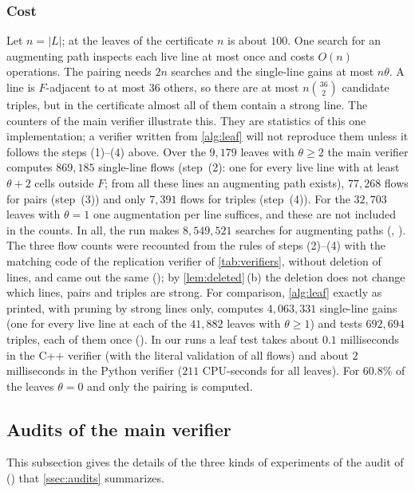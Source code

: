 \subsubsection*{Cost}
Let $n=|L|$; at the leaves of the certificate $n$ is about $100$. One search for an augmenting path
inspects each live line at most once and costs $O(n)$ operations. The pairing needs $2n$ searches and the
single-line gains at most $n\theta$. A line is $F$-adjacent to at most $36$ others, so there are at most
$n\binom{36}{2}$ candidate triples, but in the certificate almost all of them contain a strong line. The
counters of the main verifier illustrate this. They are statistics of this one implementation; a verifier
written from \cref{alg:leaf} will not reproduce them unless it follows the steps (1)--(4) above.
Over the $9{,}179$ leaves with $\theta\ge2$ the main verifier computes $869{,}185$ single-line flows
(step~(2): one for every live line with at least $\theta+2$ cells outside $F$; from all these lines an
augmenting path exists), $77{,}268$ flows for pairs
(step~(3)) and only $7{,}391$ flows for triples (step~(4)). For the $32{,}703$ leaves with $\theta=1$ one
augmentation per line suffices, and these are not included in the counts. In all, the run makes
$8{,}549{,}521$ searches for augmenting paths (,
). The three flow counts were recounted from the rules of steps (2)--(4) with
the matching code of the replication verifier of \cref{tab:verifiers}, without deletion of lines, and
came out the same (); by \cref{lem:deleted}\,(b) the deletion does not change
which lines, pairs and triples are strong. For comparison, \cref{alg:leaf} exactly as printed, with pruning by strong
lines only, computes $4{,}063{,}331$ single-line gains (one for every live line at each of the $41{,}882$
leaves with $\theta\ge1$) and tests $692{,}694$ triples, each of them once (). In our runs a leaf test takes about $0.1$ milliseconds in the C++
verifier (with the literal validation of all flows) and about $2$ milliseconds in the Python verifier
($211$ CPU-seconds for all leaves). For $60.8\%$ of the leaves $\theta=0$ and only the pairing is
computed.

\subsection{Audits of the main verifier}\label{ssec:supp-audits}

This subsection gives the details of the three kinds of experiments of the audit of
 () that \cref{ssec:audits} summarizes.

